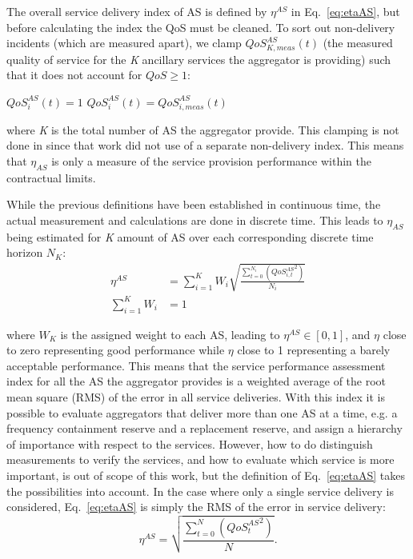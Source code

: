 The overall service delivery index of AS is defined by $\eta^{AS}$ in Eq.~\eqref{eq:etaAS}, but before calculating the index the QoS must be cleaned. To sort out non-delivery incidents (which are measured apart), we clamp $QoS_{K,meas}^{AS}(t)$ (the measured quality of service for the \emph{K} ancillary services the aggregator is providing) such that it does not account for $QoS \geq 1$: 
\begin{algorithmic}[H]
        \STATE $QoS_{i}^{AS}(t) = 1$ 
    \ELSE 
        \STATE $QoS_{i}^{AS}(t) = QoS_{i,meas}^{AS}(t)$
    \ENDIF
\ENDFOR
\ENDFOR
\end{algorithmic}
where \emph{K} is the total number of AS the aggregator provide.
This clamping is not done in \cite{bondy2014performance} since that work did not use of a separate non-delivery index. This means that $\eta_{AS}$ is only a measure of the service provision performance within the contractual limits.

While the previous definitions have been established in continuous time, the actual measurement and calculations are done in discrete time. This leads to $\eta_{AS}$ being estimated for \emph{K} amount of AS over each corresponding discrete time horizon $N_K$:
\begin{align}\label{eq:etaAS}
\eta^{AS} &= \sum^{K}_{i=1} W_i \sqrt{\frac{\sum^{N_i}_{t=0} \left( {QoS^{AS}_{i,t}}^{2} \right)}{N_i}}\\
\sum_{i=1}^K W_i &= 1
\end{align}

where $W_K$ is the assigned weight to each AS, leading to $\eta^{AS} \in [0,1]$, and $\eta$ close to zero representing good performance while $\eta$ close to 1 representing a barely acceptable performance. This means that the service performance assessment index for all the AS the aggregator provides is a weighted average of the root mean square (RMS) of the error in all service deliveries. With this index it is possible to evaluate aggregators that deliver more than one AS at a time, e.g. a frequency containment reserve and a replacement reserve, and assign a hierarchy of importance with respect to the services. However, how to do distinguish measurements to verify the services, and how to evaluate which service is more important, is out of scope of this work, but the definition of Eq.~\eqref{eq:etaAS} takes the possibilities into account. In the case where only a single service delivery is considered, Eq.~\eqref{eq:etaAS} is simply the RMS of the error in service delivery:
\begin{equation}\label{eq:etaASsimp}
\eta^{AS} = \sqrt{\frac{\sum^{N}_{t=0} \left( {QoS^{AS}_{t}}^{2} \right)}{N}}.
\end{equation}


